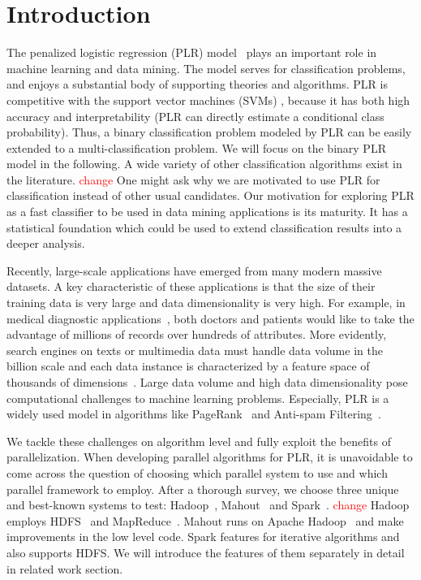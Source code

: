 \documentclass{llncs}
\newcommand{\comment}{\textcolor{red}}
\begin{document}
\section{Introduction} \label{sec:int}
The penalized logistic regression (PLR) model~\cite{HastieBook:SL} plays an important role in machine learning and data mining.
The model serves for classification problems, and enjoys a substantial body of supporting theories and algorithms.
PLR is competitive with the support vector machines (SVMs) \cite{Vapnik:1998}, because it has both high accuracy and interpretability (PLR can directly estimate a conditional class probability).
Thus, a binary classification problem modeled by PLR can be easily extended to a multi-classification problem.
We will focus on the binary PLR model in the following.
A wide variety of other classification algorithms exist in the literature. \comment{change}
One might ask why we are motivated to use PLR for classification instead of other usual candidates.
Our motivation for exploring PLR as a fast classifier to be used in data mining applications is its maturity.
It has a statistical foundation which could be used to extend classification results into a deeper analysis.

Recently, large-scale applications have emerged from many modern massive datasets.
A key characteristic of these applications is that the size of their training data is very large and data dimensionality is very high.
For example, in medical diagnostic applications~\cite{tsumoto2004mining}, both doctors and patients would like to take the advantage of millions of records over hundreds of attributes. More evidently, search engines on texts or multimedia data must handle data volume in the billion scale and each data instance is characterized by a feature space of thousands of dimensions~\cite{genkin2007large}.
Large data volume and high data dimensionality pose computational challenges to machine learning problems.
Especially, PLR is a widely used model in algorithms like PageRank~\cite{page1999pagerank} and Anti-spam Filtering~\cite{androutsopoulos2000evaluation}.

We tackle these challenges on algorithm level and fully exploit the benefits of parallelization.
When developing parallel algorithms for PLR, it is unavoidable to come across the question of choosing which parallel system to use and which parallel framework to employ.
After a thorough survey, we choose three unique and best-known systems to test: Hadoop~\cite{white2012hadoop}, Mahout~\cite{mahoutscalable} and Spark~\cite{zaharia2010spark}. \comment{change}
Hadoop employs HDFS~\cite{borthakur2008hdfs} and MapReduce~\cite{dean2008mapreduce}. Mahout runs on Apache Hadoop~\cite{gropp1999using} and make improvements in the low level code. Spark features for iterative algorithms and also supports HDFS.
We will introduce the features of them separately in detail in related work section.
\end{document}
